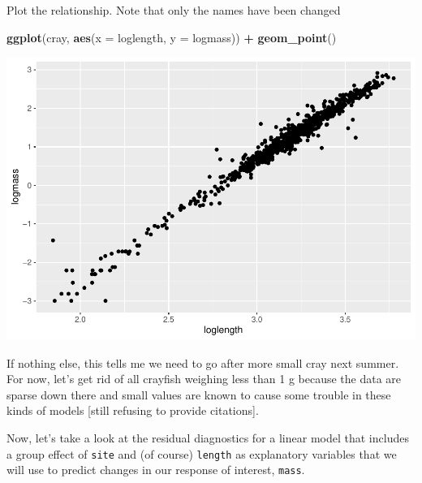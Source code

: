 \documentclass[
]{book}
\newenvironment{Shaded}{\begin{snugshade}}{\end{snugshade}}
\newcommand{\CommentTok}[1]{\textcolor[rgb]{0.56,0.35,0.01}{\textit{#1}}}
\newcommand{\DataTypeTok}[1]{\textcolor[rgb]{0.13,0.29,0.53}{#1}}
\newcommand{\DecValTok}[1]{\textcolor[rgb]{0.00,0.00,0.81}{#1}}
\newcommand{\KeywordTok}[1]{\textcolor[rgb]{0.13,0.29,0.53}{\textbf{#1}}}
\newcommand{\NormalTok}[1]{#1}
\newcommand{\OperatorTok}[1]{\textcolor[rgb]{0.81,0.36,0.00}{\textbf{#1}}}
\newcommand{\StringTok}[1]{\textcolor[rgb]{0.31,0.60,0.02}{#1}}
\begin{document}
Plot the relationship. Note that only the names have been changed

\begin{Shaded}
\begin{Highlighting}[]
\KeywordTok{ggplot}\NormalTok{(cray, }\KeywordTok{aes}\NormalTok{(}\DataTypeTok{x =}\NormalTok{ loglength, }\DataTypeTok{y =}\NormalTok{ logmass)) }\OperatorTok{+}
\StringTok{  }\KeywordTok{geom_point}\NormalTok{()}
\end{Highlighting}
\end{Shaded}

\includegraphics{worstr_files/figure-latex/unnamed-chunk-373-1.pdf}

If nothing else, this tells me we need to go after more small cray next summer. For now, let's get rid of all crayfish weighing less than 1 g because the data are sparse down there and small values are known to cause some trouble in these kinds of models {[}still refusing to provide citations{]}.

\begin{Shaded}
\end{Shaded}

Now, let's take a look at the residual diagnostics for a linear model that includes a group effect of \texttt{site} and (of course) \texttt{length} as explanatory variables that we will use to predict changes in our response of interest, \texttt{mass}.
\end{document}
